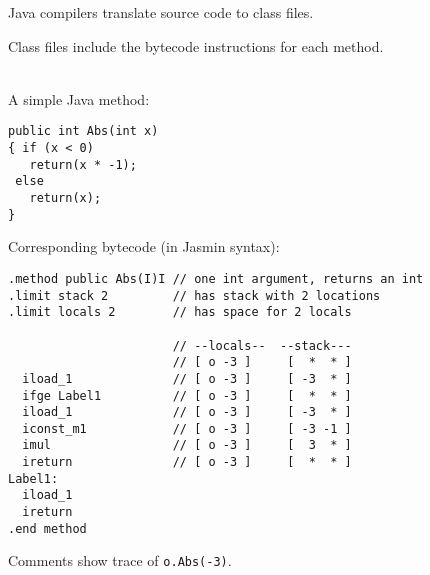 \begin{slide*}
Java compilers translate source code to class files.

Class files include the bytecode instructions for each method.\\
~\\

\begin{center}
\end{center}
\vfil
\end{slide*}

\begin{slide*}
A simple Java method:

\begin{tt}
\begin{verbatim}
public int Abs(int x)
{ if (x < 0)
   return(x * -1);
 else
   return(x);
}
\end{verbatim}
\end{tt}

Corresponding bytecode (in Jasmin syntax):

\begin{tt}
\begin{scriptsize}
\begin{verbatim}
.method public Abs(I)I // one int argument, returns an int
.limit stack 2         // has stack with 2 locations
.limit locals 2        // has space for 2 locals
 
                       // --locals--  --stack---
                       // [ o -3 ]     [  *  * ]
  iload_1              // [ o -3 ]     [ -3  * ]
  ifge Label1          // [ o -3 ]     [  *  * ]
  iload_1              // [ o -3 ]     [ -3  * ]
  iconst_m1            // [ o -3 ]     [ -3 -1 ]
  imul                 // [ o -3 ]     [  3  * ]
  ireturn              // [ o -3 ]     [  *  * ]
Label1:
  iload_1
  ireturn
.end method
\end{verbatim}
\end{scriptsize}
\end{tt}

Comments show trace of {\tt o.Abs(-3)}.
\vfil
\end{slide*}

